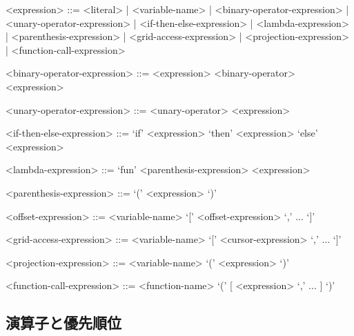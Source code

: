 \documentclass{jsarticle}
\begin{document}
\begin{grammar}
  <expression> ::= <literal> | <variable-name> |
<binary-operator-expression> |
<unary-operator-expression>  |
<if-then-else-expression>    |
<lambda-expression>    |
<parenthesis-expression>     |
<grid-access-expression>    |
<projection-expression>    |
<function-call-expression>

<binary-operator-expression> ::= <expression> <binary-operator> <expression>

<unary-operator-expression>  ::= <unary-operator> <expression>

<if-then-else-expression>    ::= `if' <expression> `then' <expression> `else' <expression>

<lambda-expression>    ::= `fun'  <parenthesis-expression>  <expression>

<parenthesis-expression>     ::= `('  <expression>  `)'

<offset-expression>          ::= <variable-name> `[' <offset-expression> `,' ... `]'

<grid-access-expression>     ::= <variable-name> `[' <cursor-expression> `,' ... `]'

<projection-expression>      ::= <variable-name> `(' <expression> `)'

<function-call-expression>   ::= <function-name> `(' [ <expression> `,' ... ] `)'
\end{grammar}



\subsection{演算子と優先順位}
\end{document}
